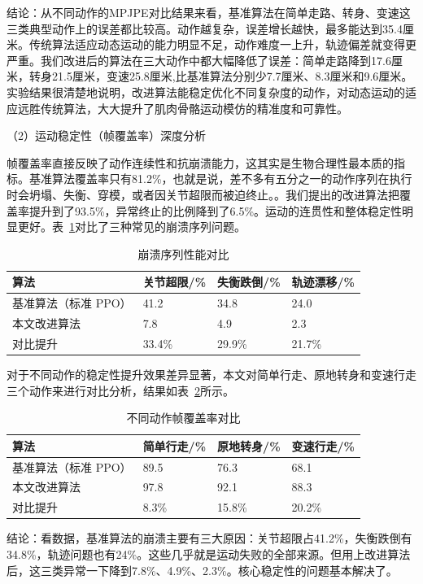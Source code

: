 结论：从不同动作的MPJPE对比结果来看，基准算法在简单走路、转身、变速这三类典型动作上的误差都比较高。动作越复杂，误差增长越快，最多能达到35.4厘米。传统算法适应动态运动的能力明显不足，动作难度一上升，轨迹偏差就变得更严重。我们改进后的算法在三大动作中都大幅降低了误差：简单走路降到17.6厘米，转身21.5厘米，变速25.8厘米,比基准算法分别少7.7厘米、8.3厘米和9.6厘米。实验结果很清楚地说明，改进算法能稳定优化不同复杂度的动作，对动态运动的适应远胜传统算法，大大提升了肌肉骨骼运动模仿的精准度和可靠性。

（2）运动稳定性（帧覆盖率）深度分析

帧覆盖率直接反映了动作连续性和抗崩溃能力，这其实是生物合理性最本质的指标。基准算法覆盖率只有81.2\%，也就是说，差不多有五分之一的动作序列在执行时会坍塌、失衡、穿模，或者因关节超限而被迫终止。。我们提出的改进算法把覆盖率提升到了93.5\%，异常终止的比例降到了6.5\%。运动的连贯性和整体稳定性明显更好。表~\ref{tab:4-5}对比了三种常见的崩溃序列问题。

\begin{table}[htbp]
\centering
\caption{崩溃序列性能对比}
\label{tab:4-5}
\small
\begin{tabularx}{\textwidth}{lXXX}
\toprule
算法 & 关节超限/\% & 失衡跌倒/\% & 轨迹漂移/\% \\
\midrule
基准算法（标准 PPO） & 41.2 & 34.8 & 24.0 \\
本文改进算法 & 7.8 & 4.9 & 2.3 \\
对比提升 & 33.4\% & 29.9\% & 21.7\% \\
\bottomrule
\end{tabularx}
\end{table}

对于不同动作的稳定性提升效果差异显著，本文对简单行走、原地转身和变速行走三个动作来进行对比分析，结果如表~\ref{tab:4-6}所示。

\begin{table}[htbp]
\centering
\caption{不同动作帧覆盖率对比}
\label{tab:4-6}
\small
\begin{tabularx}{\textwidth}{lXXX}
\toprule
算法 & 简单行走/\% & 原地转身/\% & 变速行走/\% \\
\midrule
基准算法（标准 PPO） & 89.5 & 76.3 & 68.1 \\
本文改进算法 & 97.8 & 92.1 & 88.3 \\
对比提升 & 8.3\% & 15.8\% & 20.2\% \\
\bottomrule
\end{tabularx}
\end{table}

结论：看数据，基准算法的崩溃主要有三大原因：关节超限占41.2\%，失衡跌倒有34.8\%，轨迹问题也有24\%。这些几乎就是运动失败的全部来源。但用上改进算法后，这三类异常一下降到7.8\%、4.9\%、2.3\%。核心稳定性的问题基本解决了。

